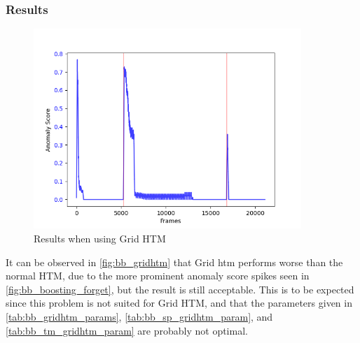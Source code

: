 \subsubsection{Results}
\begin{figure}[H]
    \centering
    \includegraphics[width=0.9\textwidth]{resources/experiments/bouncing_ball/bb_grid}
    \caption[Bouncing Ball Experiment Anomaly Score Grid HTM]{Results when using Grid HTM}
    \label{fig:bb_gridhtm}
\end{figure}
It can be observed in \autoref{fig:bb_gridhtm} that Grid \gls*{htm} performs worse than the normal HTM, due to the more prominent anomaly score spikes seen in \autoref{fig:bb_boosting_forget}, but the result is still acceptable. This is to be expected since this problem is not suited for Grid HTM, and that the parameters given in \autoref{tab:bb_gridhtm_params}, \autoref{tab:bb_sp_gridhtm_param}, and \autoref{tab:bb_tm_gridhtm_param} are probably not optimal.
